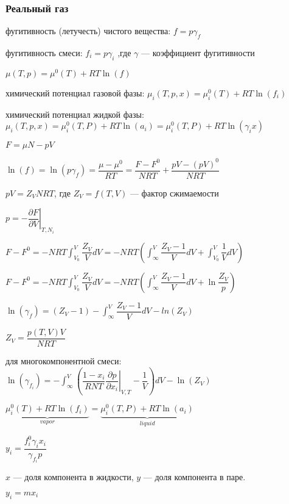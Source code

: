 \begin{frame}
\frametitle{Реальный газ}
фугитивность (летучесть) чистого вещества:
$f=p \gamma_f$

фугитивность смеси:
$f_i= p \gamma_i$
,где $\gamma$ --- коэффициент фугитивности

$\mu( T, p ) =\mu^0( T )+ RT \ln( f )$

химический потенциал газовой фазы:
$\mu_i( T, p,x ) =\mu^0_i( T )+ RT \ln( f_i )$

химический потенциал жидкой фазы:
$\mu_i( T, p,x ) =\mu^0_i( T,P )+ RT \ln( a_i )=\mu^0_i( T,P )+ RT \ln( \gamma_i x )$
\end{frame}

\begin{frame}
	$F=\mu N -pV$
	
	$\ln( f )=\ln( p \gamma_f ) = \dfrac { \mu -\mu^0 } {RT} = \dfrac{ F-F^0 } { NRT } + \dfrac{ pV- (pV)^0 } {NRT}$
	
	$pV=Z_V N R T$, где $Z_V =f( T, V )$ --- фактор сжимаемости
	
	$p= - \left. \dfrac{ \partial F } { \partial V }  \right|  _{ T,N_i }$
	
	$F-F^0=-NRT \int_{V_0}^V \dfrac{Z_V}{V} dV=-NRT \left( \int_\infty^V {\dfrac{Z_V-1}{V} dV} +{\int_{V_0}^V {\dfrac{1} {V} dV}}   \right)$
	
	$F-F^0=-NRT \int_{V_0}^V \dfrac{Z_V}{V} dV=-NRT \left( \int_\infty^V {\dfrac{Z_V-1}{V} dV} +\ln \dfrac{Z_V}{p}  \right)$
	
		
\end{frame}

\begin{frame}

$\ln( \gamma_f ) = ( Z_V -1 ) - \int_\infty^V { \dfrac{Z_V -1} {V} dV } -ln( Z_V )$

$Z_V = \dfrac{p(T,V) V} { N R T}$

для многокомпонентной смеси:
$\ln( \gamma_{f_i} ) = -\int_\infty^ V \left( \dfrac{1-x_i}{RNT} \left. \dfrac{\partial p}{\partial x_i}  \right|_{V,T} - \dfrac{1} {V}   \right ) dV - \ln( Z_V )$

$\underbrace{\mu^0_i(T)+RT \ln(f_i)}_ {vapor} = \underbrace{\mu^0_i(T,P)+RT \ln(a_i)}_{liquid} $


$y_i=\dfrac{ f_i^0 \gamma_i x_i } { \gamma_{f_i} p  }$

$x$ --- доля компонента в жидкости, $y$ --- доля компонента в паре.

$y_i=m x_i$

\end{frame}


